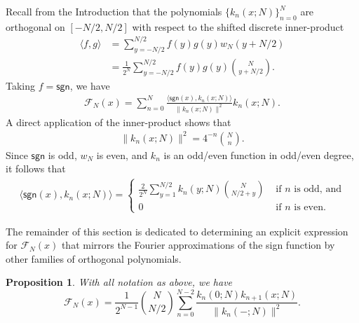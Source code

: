 \documentclass{amsart}
\newcommand{\sgn}{\mathsf{sgn}}
\theoremstyle{plain}
\newtheorem{prop}[equation]{Proposition}
\theoremstyle{remark}
\begin{document}
Recall from the Introduction that the polynomials $\lbrace k_n(x;N) \rbrace_{n=0}^N$ are orthogonal on $[-N/2,N/2]$ with respect to the shifted discrete inner-product
\begin{align*}
\langle f,g \rangle &= \sum_{y=-N/2}^{N/2} f(y)g(y) w_N(y+N/2) \\
&=\frac{1}{2^N}\sum_{y=-N/2}^{N/2} f(y)g(y) \binom{N}{y+N/2}.
\end{align*}
Taking $f = \sgn$, we have
\begin{align} \label{initial_Fourier_approx}
\mathcal{F}_N(x) = \sum_{n=0}^N \frac{\langle \sgn(x),k_n(x;N) \rangle}{\| k_n(x;N) \|^2} k_n(x;N).
\end{align}
A direct application of the inner-product shows that
\begin{align} \label{norm_identity}
\| k_n(x;N) \|^2 = 4^{-n}\binom{N}{n}.
\end{align}
Since $\sgn$ is odd, $w_N$ is even, and $k_n$ is an odd/even function in odd/even degree, it follows that
\begin{align} \label{fourier_projection}
\langle \sgn(x),k_n(x;N) \rangle = \begin{cases} \frac{2}{2^N} \sum_{y=1}^{N/2}k_n(y;N)\binom{N}{N/2+y} & \text{ if $n$ is odd, and} \\
0 & \text{ if $n$ is even.}
\end{cases} 
\end{align}

The remainder of this section is dedicated to determining an explicit expression for $\mathcal{F}_N(x)$ that mirrors the Fourier approximations of the sign function by other families of orthogonal polynomials.

\begin{prop} \label{fourier_approx}
With all notation as above, we have
\[
\mathcal{F}_N(x) = \frac{1}{2^{N-1}} \binom{N}{N/2} \sum_{n=0}^{N-2} \frac{k_{n}(0;N) k_{n+1}(x;N)}{\| k_{n}(-;N) \|^2}.
\]
\end{prop}
\end{document}
